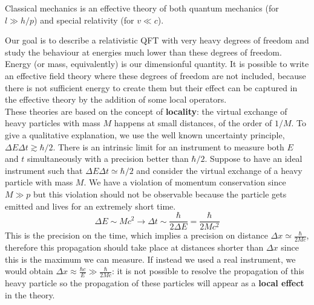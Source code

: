 \documentclass[../main.tex]{subfiles}
\begin{document}
\begin{example}
Classical mechanics is an effective theory of both quantum mechanics (for $l\gg h/p$) and special relativity (for $v\ll c$).
\end{example}
Our goal is to describe a relativistic QFT with very heavy degrees of freedom and study the behaviour at energies much lower than these degrees of freedom. Energy (or mass, equivalently) is our dimensionful quantity. It is possible to write an effective field theory where these degrees of freedom are not included, because there is not sufficient energy to create them but their effect can be captured in the effective theory by the addition of some local operators.\\
These theories are based on the concept of \textbf{locality}: the virtual exchange of heavy particles with mass $M$ happens at small distances, of the order of $1/M$. To give a qualitative explanation, we use the well known uncertainty principle, $\Delta E\Delta t\gtrsim\hbar/2$. There is an intrinsic limit for an instrument to measure both $E$ and $t$ simultaneously with a precision better than $\hbar/2$. Suppose to have an ideal instrument such that $\Delta E\Delta t\simeq\hbar/2$ and consider the virtual exchange of a heavy particle with mass $M$. We have a violation of momentum conservation since $M\gg p$ but this violation should not be observable because the particle gets emitted and lives for an extremely short time. 
\[
\Delta E\sim Mc^2\to\Delta t\sim\frac{\hbar}{2\Delta E}=\frac{\hbar}{2Mc^2}
\]
This is the precision on the time, which implies a precision on distance $\Delta x\simeq\frac{\hbar}{2Mc}$, therefore this propagation should take place at distances shorter than $\Delta x$ since this is the maximum we can measure. If instead we used a real instrument, we would obtain $\Delta x\approx\frac{\hbar c}{E}\gg \frac{\hbar}{2Mc}$: it is not possible to resolve the propagation of this heavy particle so the propagation of these particles will appear as a \textbf{local effect} in the theory.
\end{document}
